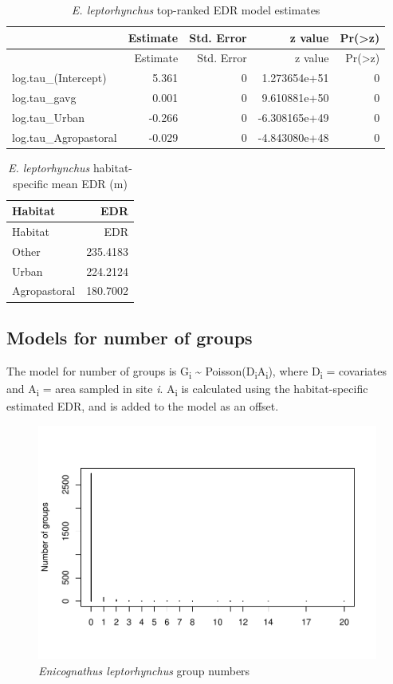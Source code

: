 \documentclass[]{article}
\begin{document}
\begin{longtable}[]{@{}lrrrr@{}}
\caption{\textit{E. leptorhynchus} top-ranked EDR model
estimates}\tabularnewline
\toprule
& Estimate & Std. Error & z value &
Pr(\textgreater{}\textbar{}z\textbar{})\tabularnewline
\midrule
\endfirsthead
\toprule
& Estimate & Std. Error & z value &
Pr(\textgreater{}\textbar{}z\textbar{})\tabularnewline
\midrule
\endhead
log.tau\_(Intercept) & 5.361 & 0 & 1.273654e+51 & 0\tabularnewline
log.tau\_gavg & 0.001 & 0 & 9.610881e+50 & 0\tabularnewline
log.tau\_Urban & -0.266 & 0 & -6.308165e+49 & 0\tabularnewline
log.tau\_Agropastoral & -0.029 & 0 & -4.843080e+48 & 0\tabularnewline
\bottomrule
\end{longtable}

\begin{longtable}[]{@{}lr@{}}
\caption{\textit{E. leptorhynchus} habitat-specific mean EDR
(m)}\tabularnewline
\toprule
Habitat & EDR\tabularnewline
\midrule
\endfirsthead
\toprule
Habitat & EDR\tabularnewline
\midrule
\endhead
Other & 235.4183\tabularnewline
Urban & 224.2124\tabularnewline
Agropastoral & 180.7002\tabularnewline
\bottomrule
\end{longtable}

\subsection{Models for number of
groups}\label{models-for-number-of-groups-1}

The model for number of groups is G\textsubscript{i} \textasciitilde{}
Poisson(D\textsubscript{i}A\textsubscript{i}), where D\textsubscript{i}
= covariates and A\textsubscript{i} = area sampled in site \emph{i}.
A\textsubscript{i} is calculated using the habitat-specific estimated
EDR, and is added to the model as an offset.

\begin{figure}[H]
\includegraphics{Patagonia_parrots_density_analysis_files/figure-latex/unnamed-chunk-25-1} \caption{\textit{Enicognathus leptorhynchus} group numbers }\label{fig:unnamed-chunk-25}
\end{figure}
\end{document}
